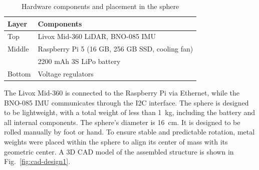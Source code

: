 \documentclass[a4paper, conference]{IEEEtran}
\begin{document}
\begin{table}
\centering
\caption{Hardware components and placement in the sphere}
\label{tab:hardware_components_non_actuated}
\begin{tabularx}{\linewidth}{@{}l X@{}}
\toprule
\textbf{Layer} & \textbf{Components} \\
\midrule
Top    & Livox Mid-360 LiDAR, BNO-085 IMU \\
Middle & Raspberry Pi 5 (16 GB, 256 GB SSD, cooling fan) \\
       & 2200 mAh 3S LiPo battery \\
Bottom & Voltage regulators \\
\bottomrule
\end{tabularx}
\vspace{-1em}
\end{table}
The Livox Mid-360 is connected to the Raspberry Pi via Ethernet, while the BNO-085 IMU communicates through the I2C interface. 
The sphere is designed to be lightweight, with a total weight of less than \SI{1}{\kilo\gram}, including the battery and all internal components. 
The sphere's diameter is \SI{16}{\centi\meter}. 
It is designed to be rolled manually by foot or hand.
To ensure stable and predictable rotation, metal weights were placed within the sphere to align its center of mass with its geometric center. 
A 3D CAD model of the assembled structure is shown in Fig.~\ref{fig:cad-design1}.
\end{document}
